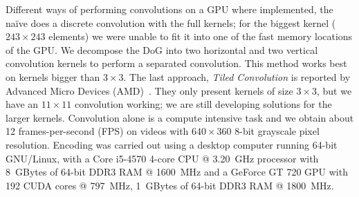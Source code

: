 Different ways of performing convolutions on a GPU where implemented, the naïve
does a discrete convolution with the full kernels; for the biggest kernel 
($243\times243$ elements) we were unable to fit it into one of the fast memory
locations of the GPU. We decompose the DoG into two horizontal and two vertical
convolution kernels to perform a separated convolution. This method works best 
on kernels bigger than $3\times3$. The last approach, \emph{Tiled Convolution} 
is reported by Advanced Micro Devices (AMD)~\cite{tiled-convolution}. They only 
present kernels of size $3\times3$, but we have an $11\times11$ convolution 
working; we are still developing solutions for the larger kernels.
Convolution alone is a compute intensive task and we 
obtain about 12 frames-per-second (FPS) on videos with $640\times360$ 8-bit 
grayscale pixel resolution. Encoding was carried out using a desktop computer 
running 64-bit GNU/Linux, with a Core i5-4570 4-core CPU @ 3.20~GHz processor 
with 8~GBytes of 64-bit DDR3 RAM @ 1600~MHz and a GeForce GT 720 GPU with 192 
CUDA cores @ 797~MHz, 1~GBytes of 64-bit DDR3 RAM @ 1800~MHz. %


